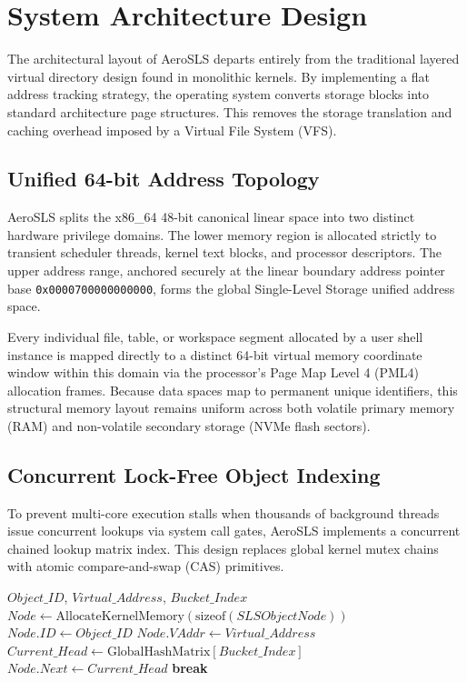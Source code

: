 \documentclass[sigconf]{acmart}
\begin{document}
\section{System Architecture Design}
\label{sec:design}

The architectural layout of AeroSLS departs entirely from the
traditional layered virtual directory design found in monolithic
kernels.  By implementing a flat address tracking strategy, the
operating system converts storage blocks into standard
architecture page structures.  This removes the storage
translation and caching overhead imposed by a Virtual File
System (VFS).

\subsection{Unified 64-bit Address Topology}
AeroSLS splits the x86\_64 48-bit canonical linear space into
two distinct hardware privilege domains.  The lower memory region
is allocated strictly to transient scheduler threads, kernel
text blocks, and processor descriptors.  The upper address range,
anchored securely at the linear boundary address pointer base
\texttt{0x0000700000000000}, forms the global Single-Level
Storage unified address space.

Every individual file, table, or workspace segment allocated by a
user shell instance is mapped directly to a distinct 64-bit
virtual memory coordinate window within this domain via the
processor's Page Map Level 4 (PML4) allocation frames.  Because
data spaces map to permanent unique identifiers, this structural
memory layout remains uniform across both volatile primary memory
(RAM) and non-volatile secondary storage (NVMe flash sectors).

\subsection{Concurrent Lock-Free Object Indexing}
To prevent multi-core execution stalls when thousands of
background threads issue concurrent lookups via system call
gates, AeroSLS implements a concurrent chained lookup matrix
index.  This design replaces global kernel mutex chains with
atomic compare-and-swap (CAS) primitives.

\begin{algorithm}[h]
\caption{Lock-Free Head Node Entry Insertion}
\label{alg:cas_insertion}
\begin{algorithmic}[1]
\REQUIRE $Object\_ID$, $Virtual\_Address$, $Bucket\_Index$
\STATE $Node \leftarrow
  \text{AllocateKernelMemory}(\text{sizeof}(SLSObjectNode))$
\STATE $Node.ID \leftarrow Object\_ID$
\STATE $Node.VAddr \leftarrow Virtual\_Address$
\LOOP
  \STATE $Current\_Head \leftarrow
    \text{GlobalHashMatrix}[Bucket\_Index]$
  \STATE $Node.Next \leftarrow Current\_Head$
    \STATE \textbf{break}
  \ENDIF
\ENDLOOP
\end{algorithmic}
\end{algorithm}
\end{document}
